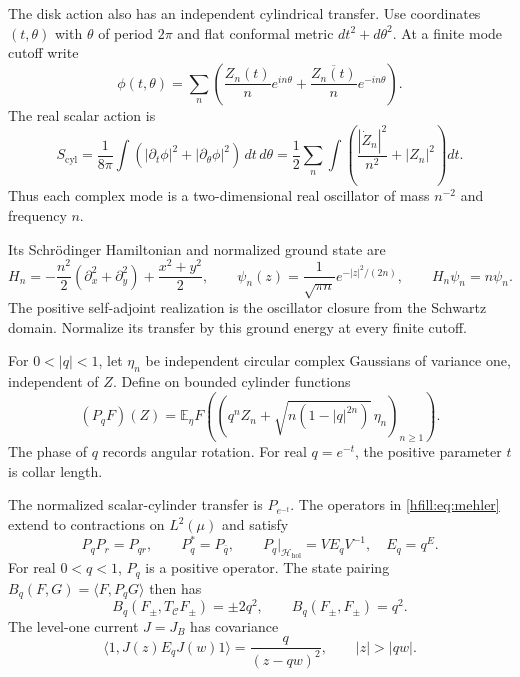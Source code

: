 The disk action also has an independent cylindrical transfer.
Use coordinates $(t,\theta)$ with $\theta$ of period $2\pi$ and
flat conformal metric $dt^2+d\theta^2$.
At a finite mode cutoff write
\[
 \phi(t,\theta)=\sum_n
 \left(\frac{Z_n(t)}n e^{in\theta}
       +\frac{\overline{Z_n(t)}}n e^{-in\theta}\right).
\]
The real scalar action is
\begin{equation}\label{hfill:eq:cylinder-action}
 S_{\mathrm{cyl}}
 =\frac1{8\pi}\int
       (|\partial_t\phi|^2+|\partial_\theta\phi|^2)
                                      \,dt\,d\theta
 =\frac12\sum_n\int
       \left(\frac{|\dot Z_n|^2}{n^2}+|Z_n|^2\right)dt.
\end{equation}
Thus each complex mode is a two-dimensional real oscillator of
mass $n^{-2}$ and frequency $n$.

Its Schrödinger Hamiltonian and normalized ground state are
\[
 H_n=-\frac{n^2}{2}(\partial_x^2+\partial_y^2)
                   +\frac{x^2+y^2}{2},
 \qquad
 \psi_n(z)=\frac1{\sqrt{\pi n}}e^{-|z|^2/(2n)},
 \qquad H_n\psi_n=n\psi_n.
\]
The positive self-adjoint realization is the oscillator closure
from the Schwartz domain.
Normalize its transfer by this ground energy at every finite cutoff.

For $0<|q|<1$, let $\eta_n$ be independent circular complex Gaussians
of variance one, independent of $Z$.
Define on bounded cylinder functions
\begin{equation}\label{hfill:eq:mehler}
 (P_qF)(Z)=\mathbb E_\eta
 F\left(\left(q^nZ_n+\sqrt{n(1-|q|^{2n})}\,\eta_n
                                                   \right)_{n\geq1}\right).
\end{equation}
The phase of $q$ records angular rotation.
For real $q=e^{-t}$, the positive parameter $t$ is collar length.

\begin{theorem}\label{hfill:thm:sewing}
The normalized scalar-cylinder transfer is $P_{e^{-t}}$.
The operators in \eqref{hfill:eq:mehler} extend to contractions on
$L^2(\mu)$ and satisfy
\begin{equation}\label{hfill:eq:sewing-laws}
 P_qP_r=P_{qr},\qquad P_q^*=P_{\bar q},\qquad
 P_q|_{\mathcal H_{\mathrm{hol}}}=VE_qV^{-1},
 \quad E_q=q^E.
\end{equation}
For real $0<q<1$, $P_q$ is a positive operator.
The state pairing $B_q(F,G)=\langle F,P_qG\rangle$ then has
\[
 B_q(F_\pm,T_{\mathcal C}F_\pm)=\pm2q^2,
 \qquad B_q(F_\pm,F_\pm)=q^2.
\]
The level-one current $J=J_B$ has covariance
\begin{equation}\label{hfill:eq:covariance}
 \langle1,J(z)E_qJ(w)1\rangle
 =\frac{q}{(z-qw)^2},\qquad |z|>|qw|.
\end{equation}
\end{theorem}

